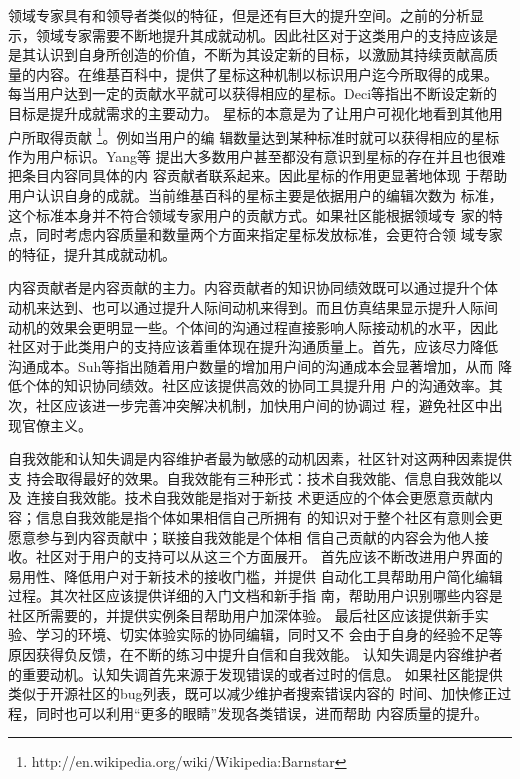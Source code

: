 领域专家具有和领导者类似的特征，但是还有巨大的提升空间。之前的分析显
示，领域专家需要不断地提升其成就动机。因此社区对于这类用户的支持应该是
是其认识到自身所创造的价值，不断为其设定新的目标，以激励其持续贡献高质
量的内容。在维基百科中，提供了星标这种机制以标识用户迄今所取得的成果。
每当用户达到一定的贡献水平就可以获得相应的星标。Deci等指出不断设定新的
目标是提升成就需求的主要动力\cite{deci2001need}。
星标的本意是为了让用户可视化地看到其他用户所取得贡献
\footnote{http://en.wikipedia.org/wiki/Wikipedia:Barnstar}。例如当用户的编
辑数量达到某种标准时就可以获得相应的星标作为用户标识。Yang等
提出大多数用户甚至都没有意识到星标的存在并且也很难把条目内容同具体的内
容贡献者联系起来\cite{yang2010motivations}。因此星标的作用更显著地体现
于帮助用户认识自身的成就。当前维基百科的星标主要是依据用户的编辑次数为
标准，这个标准本身并不符合领域专家用户的贡献方式。如果社区能根据领域专
家的特点，同时考虑内容质量和数量两个方面来指定星标发放标准，会更符合领
域专家的特征，提升其成就动机。

内容贡献者是内容贡献的主力。内容贡献者的知识协同绩效既可以通过提升个体
动机来达到、也可以通过提升人际间动机来得到。而且仿真结果显示提升人际间
动机的效果会更明显一些。个体间的沟通过程直接影响人际接动机的水平，因此
社区对于此类用户的支持应该着重体现在提升沟通质量上。首先，应该尽力降低
沟通成本。Suh等指出随着用户数量的增加用户间的沟通成本会显著增加，从而
降低个体的知识协同绩效\cite{1641322}。社区应该提供高效的协同工具提升用
户的沟通效率。其次，社区应该进一步完善冲突解决机制，加快用户间的协调过
程，避免社区中出现官僚主义。

自我效能和认知失调是内容维护者最为敏感的动机因素，社区针对这两种因素提供支
持会取得最好的效果。自我效能有三种形式：技术自我效能、信息自我效能以及
连接自我效能\cite{tedjamulia2005motivating}。技术自我效能是指对于新技
术更适应的个体会更愿意贡献内容；信息自我效能是指个体如果相信自己所拥有
的知识对于整个社区有意则会更愿意参与到内容贡献中；联接自我效能是个体相
信自己贡献的内容会为他人接收。社区对于用户的支持可以从这三个方面展开。
首先应该不断改进用户界面的易用性、降低用户对于新技术的接收门槛，并提供
自动化工具帮助用户简化编辑过程。其次社区应该提供详细的入门文档和新手指
南，帮助用户识别哪些内容是社区所需要的，并提供实例条目帮助用户加深体验。
最后社区应该提供新手实验、学习的环境、切实体验实际的协同编辑，同时又不
会由于自身的经验不足等原因获得负反馈，在不断的练习中提升自信和自我效能。
认知失调是内容维护者的重要动机。认知失调首先来源于发现错误的或者过时的信息。
如果社区能提供类似于开源社区的bug列表，既可以减少维护者搜索错误内容的
时间、加快修正过程，同时也可以利用“更多的眼睛”发现各类错误，进而帮助
内容质量的提升。

